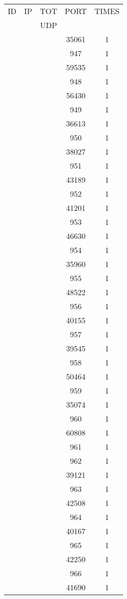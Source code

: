 \documentclass[a4paper]{scrartcl}
\begin{document}
\begin{minipage}[b]{0.5\linewidth}
\begin{tabular}{| c | c | c | c | c |}
\hline
ID & IP & TOT & PORT & TIMES \\ 
   &    & UDP &      &       \\ 
\hline
& & & 35061 & 1 \\ & & & 947 & 1 \\ & & & 59535 & 1 \\ & & & 948 & 1 \\ & & & 56430 & 1 \\ & & & 949 & 1 \\ & & & 36613 & 1 \\ & & & 950 & 1 \\ & & & 38027 & 1 \\ & & & 951 & 1 \\ & & & 43189 & 1 \\ & & & 952 & 1 \\ & & & 41201 & 1 \\ & & & 953 & 1 \\ & & & 46630 & 1 \\ & & & 954 & 1 \\ & & & 35960 & 1 \\ & & & 955 & 1 \\ & & & 48522 & 1 \\ & & & 956 & 1 \\ & & & 40155 & 1 \\ & & & 957 & 1 \\ & & & 39545 & 1 \\ & & & 958 & 1 \\ & & & 50464 & 1 \\ & & & 959 & 1 \\ & & & 35074 & 1 \\ & & & 960 & 1 \\ & & & 60808 & 1 \\ & & & 961 & 1 \\ & & & 962 & 1 \\ & & & 39121 & 1 \\ & & & 963 & 1 \\ & & & 42508 & 1 \\ & & & 964 & 1 \\ & & & 40167 & 1 \\ & & & 965 & 1 \\ & & & 42250 & 1 \\ & & & 966 & 1 \\ & & & 41690 & 1 \\ \hline\end{tabular}\end{minipage} \hfill\begin{minipage}[b]{0.5\linewidth}\begin{tabular}{| c | c | c | c | c |}

\end{tabular}
\end{minipage}
\end{document}
